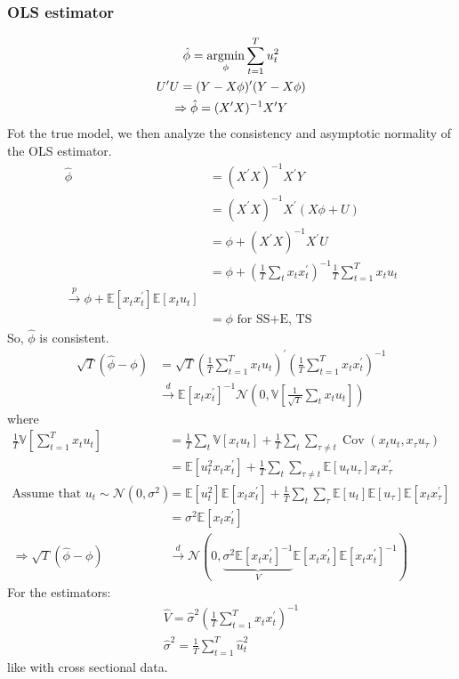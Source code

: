 \subsubsection{OLS estimator}
\begin{gather*}
    \hat{\phi} = \operatorname*{arg min}_{\phi} \sum_{t=1}^{T} u_t^2 \\
    U^{\prime} U = (Y - X\phi)^{\prime} (Y - X\phi) \\
    \Rightarrow \hat{\phi} = (X^{\prime} X)^{-1} X^{\prime} Y
\end{gather*}
Fot the true model, we then analyze the consistency and asymptotic normality of the OLS estimator.
\begin{align*}
    \hat{\phi} &= (X^{\prime} X)^{-1} X^{\prime} Y \\
    &= (X^{\prime} X)^{-1} X^{\prime} (X\phi + U) \\
    &= \phi + (X^{\prime} X)^{-1} X^{\prime} U \\
    &= \phi + \left( \frac{1}{T} \sum_{t} x_t x_t^{\prime} \right)^{-1} \frac{1}{T} \sum_{t=1}^{T} x_t u_t \\
    \overset{p}{\rightarrow} \phi + \mathbb{E}[x_t x_t^{\prime}] \mathbb{E}[x_t u_t] \\
    &= \phi \text{ for SS+E, TS}
\end{align*}
So, $\hat{\phi}$ is consistent.
\begin{align*}
    \sqrt{T}(\hat{\phi} - \phi) &= \sqrt{T} \left( \frac{1}{T} \sum_{t=1}^{T} x_t u_t \right)^{\prime} \left( \frac{1}{T} \sum_{t=1}^{T} x_t x_t^{\prime} \right)^{-1} \\
    & \overset{d}{\rightarrow} \mathbb{E}[x_t x_t^{\prime}]^{-1} \mathcal{N} \left(0, \mathbb{V}\left[\frac{1}{\sqrt{T}} \sum_{t} x_t u_t \right]\right)
\end{align*}
where
\begin{align*}
    \frac{1}{T} \mathbb{V}\left[\sum_{t=1}^{T} x_t u_t\right] &= \frac{1}{T} \sum_{t} \mathbb{V}[x_t u_t] + \frac{1}{T} \sum_{t} \sum_{\tau \neq t} \operatorname{Cov}(x_t u_t, x_\tau u_\tau) \\
    &= \mathbb{E}[u_{t}^2 x_t x_t^{\prime}] + \frac{1}{T} \sum_{t} \sum_{\tau \neq t} \mathbb{E}[u_t u_{\tau}] x_t x_{\tau}^{\prime} \\
    \text{Assume that } u_t \sim \mathcal{N}(0, \sigma^2)
    &= \mathbb{E}[u_t^2] \mathbb{E}[x_t x_t^{\prime}] + \frac{1}{T} \sum_{t} \sum_{\tau} \mathbb{E}[u_t] \mathbb{E}[u_{\tau}] \mathbb{E}[x_t x_{\tau}^{\prime}] \\
    &= \sigma^2 \mathbb{E}[x_t x_t^{\prime}] \\
    \Rightarrow \sqrt{T}(\hat{\phi} - \phi) &\overset{d}{\rightarrow} \mathcal{N}\left(0, \underset{V}{\underbrace{\sigma^2 \mathbb{E}[x_t x_t^{\prime}]^{-1}}} \mathbb{E}[x_t x_t^{\prime}] \mathbb{E}[x_t x_t^{\prime}]^{-1} \right)
\end{align*}
For the estimators:
\begin{gather*}
    \hat{V} = \hat{\sigma}^2 \left( \frac{1}{T} \sum_{t=1}^{T} x_t x_t^{\prime} \right)^{-1} \\
    \hat{\sigma}^2 = \frac{1}{T} \sum_{t=1}^{T} \hat{u}_t^2
\end{gather*}
like with cross sectional data.

